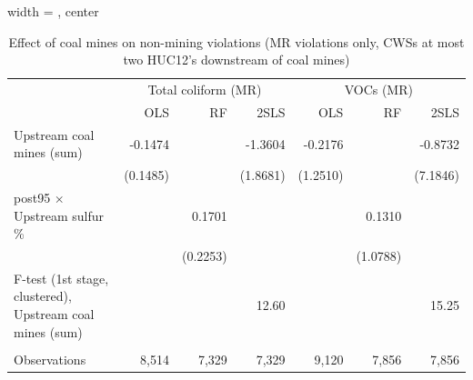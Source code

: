 
\begin{table}[htbp]
   
   \caption{\label{2sls_dwnstrm2step_nonminevio_mr_ivsum} Effect of coal mines on non-mining violations (MR violations only, CWSs at most two HUC12's downstream of coal mines)}
   \bigskip
   
   \centering
   
   \begin{adjustbox}{width = \textwidth, center}
      
      
      \begin{tabular}{lrrrrrr}
         \toprule
         
          & \multicolumn{3}{c}{Total coliform (MR)} & \multicolumn{3}{c}{VOCs (MR)}\\
         
                                                                  & OLS      & RF       & 2SLS     & OLS      & RF       & 2SLS\\  
         
         \midrule 
         Upstream coal mines (sum)                                & -0.1474  &          & -1.3604  & -0.2176  &          & -0.8732\\   
                                                                  & (0.1485) &          & (1.8681) & (1.2510) &          & (7.1846)\\   
         post95 $\times$ Upstream sulfur \%                       &          & 0.1701   &          &          & 0.1310   &   \\   
                                                                  &          & (0.2253) &          &          & (1.0788) &   \\   
         
         F-test (1st stage, clustered), Upstream coal mines (sum) &          &          & 12.60    &          &          & 15.25\\  
         
          \\
         
         Observations                                             & 8,514    & 7,329    & 7,329    & 9,120    & 7,856    & 7,856\\  
         
         \bottomrule
         
      \end{tabular}
      

\end{adjustbox}
\end{table}
